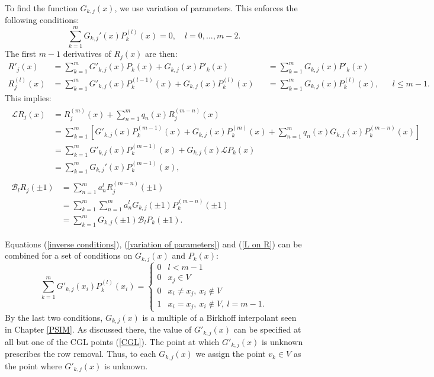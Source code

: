 \documentclass{book}
\begin{document}
To find the function $G_{k,j}(x)$, we use variation of parameters.
This enforces the following conditions:
\begin{equation} \label{variation of parameters}
\sum_{k=1}^m G_{k,j}'(x) P_k^{(l)}(x) = 0, \quad l = 0,...,m-2 .
\end{equation}
The first $m-1$ derivatives of $R_j(x)$ are then:
\begin{equation}
\begin{aligned}
R'_j(x) & = \sum_{k=1}^m G'_{k,j}(x) P_k(x) + G_{k,j}(x) P'_k(x) && = \sum_{k=1}^m G_{k,j}(x) P'_k(x) \\
R_j^{(l)}(x) & = \sum_{k=1}^m G'_{k,j}(x) P_k^{(l-1)}(x) + G_{k,j}(x) P_k^{(l)}(x) && = \sum_{k=1}^m G_{k,j}(x) P_k^{(l)}(x), && l \leq m-1 .
\end{aligned}
\end{equation}
This implies:
\begin{align} \label{L on R}
\begin{split}
\mathcal{L} R_j(x) & = R_j^{(m)}(x) + \sum_{n=1}^m q_n(x) R_j^{(m-n)}(x) \\
& = \sum_{k=1}^m \left [ G'_{k,j}(x) P_k^{(m-1)}(x) + G_{k,j}(x) P_k^{(m)}(x) + \sum_{n=1}^m q_n(x) G_{k,j}(x) P_k^{(m-n)}(x) \right ] \\
& = \sum_{k=1}^m G'_{k,j}(x) P_k^{(m-1)}(x) + G_{k,j}(x) \mathcal{L} P_k(x) \\
& = \sum_{k=1}^m G_{k,j}'(x) P_k^{(m-1)}(x) ,
\end{split} \\
\begin{split} \label{B on R}
\mathcal{B}_l R_j(\pm 1) & = \sum_{n=1}^m a_n^l R_j^{(m-n)}(\pm1) \\
& = \sum_{k=1}^m \sum_{n=1}^m a_n^l G_{k,j}(\pm1) P_k^{(m-n)}(\pm1) \\
& = \sum_{k=1}^m G_{k,j}(\pm1) \mathcal{B}_l P_k(\pm1) .
\end{split}
\end{align}

Equations (\ref{inverse conditions}), (\ref{variation of parameters}) and (\ref{L on R}) can be combined for a set of conditions on $G_{k,j}(x)$ and $P_k(x)$:
\begin{equation} \label{combined conditions}
\sum_{k=1}^m G'_{k,j}(x_i) P_k^{(l)}(x_i) = \begin{cases} 0 & l < m-1 \\
0 & x_j \in V \\
0 & x_i \neq x_j, \ x_i \notin V \\
1 & x_i = x_j, \ x_i \notin V , \ l = m-1.\end{cases} 
\end{equation}
By the last two conditions, $G_{k,j}(x)$ is a multiple of a Birkhoff interpolant seen in Chapter \ref{PSIM}.
As discussed there, the value of $G'_{k,j}(x)$ can be specified at all but one of the CGL points (\ref{CGL}).
The point at which $G'_{k,j}(x)$ is unknown prescribes the row removal.
Thus, to each $G_{k,j}(x)$ we assign the point $v_k \in V$ as the point where $G'_{k,j}(x)$ is unknown.
\end{document}
